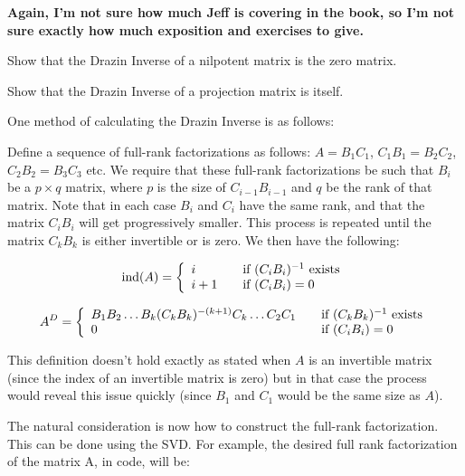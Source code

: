 {\bf Again, I'm not sure how much Jeff is covering in the book, so I'm not sure exactly how much exposition and exercises to give.}
\begin{problem}
Show that the Drazin Inverse of a nilpotent matrix is the zero matrix.
\end{problem}

\begin{problem}
Show that the Drazin Inverse of a projection matrix is itself.
\end{problem}


One method of calculating the Drazin Inverse is as follows:

Define a sequence of full-rank factorizations as follows: $A = B_1 C_1$, $C_1 B_1 = B_2 C_2$, $C_2 B_2 = B_3 C_3$ etc. We require that these full-rank factorizations be such that $B_i$ be a $p \times q$ matrix, where $p$ is the size of $C_{i-1} B_{i-1}$ and $q$ be the rank of that matrix. Note that in each case $B_i$ and $C_i$ have the same rank, and that the matrix $C_i B_i$ will get progressively smaller. This process is repeated until the matrix $C_k B_k$ is either invertible or is zero. We then have the following:

\[
\text{ind}(A) = \left\{
\begin{array} {l l}
i & \quad \text{if  $(C_i B_i)^{-1}$ exists}\\
i+1 & \quad \text {if  $(C_i B_i) = 0$}\\
\end{array} \right.
\]

\[
A^D = \left\{
\begin{array} {l l}
B_1 B_2 \ldots B_k (C_k B_k)^{-(k+1)} C_k \ldots C_2 C_1 & \quad \text{if } (C_k B_k)^{-1} \text{ exists}\\
0 & \quad \text {if } (C_i B_i) = 0 \\
\end{array} \right.
\]

This definition doesn't hold exactly as stated when $A$ is an invertible matrix (since the index of an invertible matrix is zero) but in that case the process would reveal this issue quickly (since $B_1$ and $C_1$ would be the same size as $A$).

The natural consideration is now how to construct the full-rank factorization. This can be done using the SVD. For example, the desired full rank factorization of the matrix A, in \ProgrammingLanguage code, will be:

